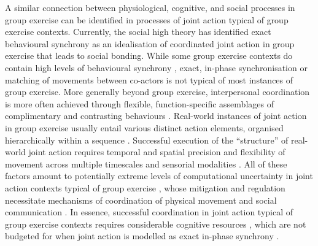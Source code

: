 \begin{CJK}{UTF8}{gbsn}
A similar connection between physiological, cognitive, and social processes in group exercise can be identified in processes of joint action typical of group exercise contexts.  Currently, the social high theory has identified exact behavioural synchrony as an idealisation of coordinated joint action in group exercise that leads to social bonding.  While some group exercise contexts do contain high levels of behavioural synchrony \citep[rowing, synchronised swimming, diving, mass calisthenics, and forms of dance such as ballet, see][]{McNeill1995}, exact, in-phase synchronisation or matching of movements between co-actors is not typical of most instances of group exercise.  More generally beyond group exercise, interpersonal coordination is more often achieved through flexible, function-specific assemblages of complimentary and contrasting behaviours \citep[for example, coordination in an interactional team sport, a dyadic conversation, or an ensemble music performance, see][]{Fusaroli2014}.  Real-world instances of joint action in group exercise usually entail various distinct action elements, organised hierarchically within a sequence \citep{Schmidt1975,Rosenbaum2009}.  Successful execution of the ``structure'' of real-world joint action requires temporal and spatial precision and flexibility of movement across multiple timescales and sensorial modalities \citep{Sebanz2006,Pacherie2012}.
All of these factors amount to potentially extreme levels of computational uncertainty in joint action contexts typical of group exercise \citep{Bernstein1967}, whose mitigation and regulation necessitate mechanisms of coordination of physical movement and social communication \citep{Turvey1978}.  In essence, successful coordination in joint action typical of group exercise contexts requires considerable cognitive resources \citep{Turvey1978}, which are not budgeted for when joint action is modelled as exact in-phase synchrony \citep{Keller2014}.




\end{CJK}
